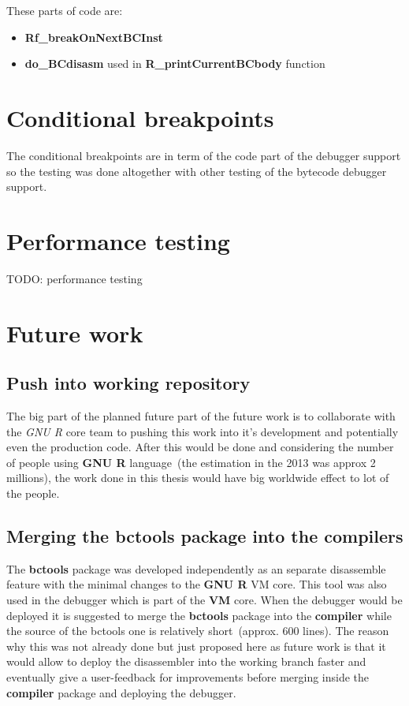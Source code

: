\documentclass[thesis=M,english]{FITthesis}[2018/10/20]
\begin{document}
These parts of code are:
\begin{itemize}
 \item \textbf{Rf{\_}breakOnNextBCInst}
 \item \textbf{do{\_}BCdisasm} used in \textbf{R{\_}printCurrentBCbody} function
\end{itemize}

\section{Conditional breakpoints}

The conditional breakpoints are in term of the code part of the debugger support so the testing was done altogether with other testing of the bytecode debugger support.

\section{Performance testing}

TODO: performance testing

\section{Future work}

\subsection{Push into working repository}

The big part of the planned future part of the future work is to collaborate with the \textit{GNU R} core team to pushing this work into it's development and potentially even the production code. After this would be done and considering the number of people using \textbf{GNU R} language~(the estimation in the 2013 was approx 2 millions), the work done in this thesis would have big worldwide effect to lot of the people.

\subsection{Merging the bctools package into the compilers}

The \textbf{bctools} package was developed independently as an separate disassemble feature with the minimal changes to the \textbf{GNU R} VM core. This tool was also used in the debugger which is part of the \textbf{VM} core. When the debugger would be deployed it is suggested to merge the \textbf{bctools} package into the \textbf{compiler} while the source of the bctools one is relatively short~(approx. 600 lines). The reason why this was not already done but just proposed here as future work is that it would allow to deploy the disassembler into the working branch faster and eventually give a user-feedback for improvements before merging inside the \textbf{compiler} package and deploying the debugger.
\end{document}
